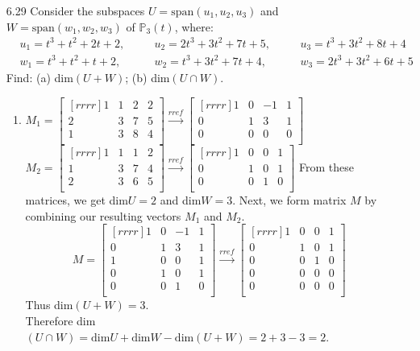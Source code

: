 \documentclass[12pt]{article}
\theoremstyle{definition}
\theoremstyle{plain}
\begin{document}
\begin{enumerate}
\item[6.29] Consider the subspaces $U=\mathrm{span}(u_1,u_2,u_3)$ and $W=\mathrm{span}(w_1,w_2,w_3)$ of $\mathbb{P}_3(t)$, where:
\begin{align*}
&u_1=t^3+t^2+2t+2, \quad &&u_2=2t^3+3t^2+7t+5, \quad &&u_3=t^3+3t^2+8t+4\\
&w_1=t^3+t^2+t+2, \quad &&w_2=t^3+3t^2+7t+4, \quad &&w_3=2t^3+3t^2+6t+5
\end{align*}
Find: (a) dim$(U+W)$; (b) dim$(U \cap W)$.
	\begin{enumerate}
	\item $M_1=\begin{bmatrix}[rrrr]1&1&2&2\\2&3&7&5\\1&3&8&4\\\end{bmatrix} \xrightarrow[]{rref} \begin{bmatrix}[rrrr]1&0&-1&1\\0&1&3&1\\0&0&0&0\\\end{bmatrix}$\\
	$M_2=\begin{bmatrix}[rrrr]1&1&1&2\\1&3&7&4\\2&3&6&5\\\end{bmatrix} \xrightarrow[]{rref} \begin{bmatrix}[rrrr]1&0&0&1\\0&1&0&1\\0&0&1&0\\\end{bmatrix}$
	From these matrices, we get dim$U=2$ and dim$W=3$.
	Next, we form matrix $M$ by combining our resulting vectors $M_1$ and $M_2$.
	\[ M = \begin{bmatrix}[rrrr]1&0&-1&1\\0&1&3&1\\1&0&0&1\\0&1&0&1\\0&0&1&0\\\end{bmatrix} \xrightarrow[]{rref} \begin{bmatrix}[rrrr]1&0&0&1\\0&1&0&1\\0&0&1&0\\0&0&0&0\\0&0&0&0\\\end{bmatrix} \]
	Thus dim$(U+W)=3$.\\
	Therefore dim$(U \cap W) = \mathrm{dim}U+\mathrm{dim}W-\mathrm{dim}(U+W)=2+3-3=2$.
	\end{enumerate}


\end{enumerate}
\end{document}
